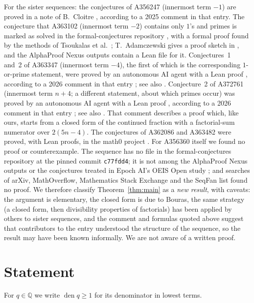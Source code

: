 \documentclass[11pt]{amsart}
\theoremstyle{plain}
\theoremstyle{definition}
\newcommand{\Q}{\mathbb{Q}}
\DeclareMathOperator{\den}{den}
\begin{document}
For the sister sequences: the conjectures of A356247 (innermost term $-1$) are proved in a note of B.~Cloitre \cite{Cloitre}, according to a 2025 comment in that entry. The conjecture that A363102 (innermost term $-2$) contains only $1$'s and primes is marked as solved in the formal-conjectures repository \cite{FC}, with a formal proof found by the methods of Tsoukalas et al.\ \cite{Tsoukalas}; T.~Adamczewski gives a proof sketch in \cite[Appendix~A]{Ad}, and the AlphaProof Nexus outputs \cite{APN} contain a Lean file for it. Conjectures~1 and~2 of A363347 (innermost term $-4$), the first of which is the corresponding $1$-or-prime statement, were proved by an autonomous AI agent with a Lean proof \cite{APN}, according to a 2026 comment in that entry \cite{A363347}; see also \cite[Appendix~A]{Ad}. Conjecture~2 of A372761 (innermost term $n+4$; a different statement, about which primes occur) was proved by an autonomous AI agent with a Lean proof \cite{APN}, according to a 2026 comment in that entry \cite{A372761}; see also \cite[Appendix~A]{Ad}. That comment describes a proof which, like ours, starts from a closed form of the continued fraction with a factorial-sum numerator over $2(5n-4)$. The conjectures of A362086 and A363482 were proved, with Lean proofs, in the math0 project \cite{M0A362086,M0A363482}.
For A356360 itself we found no proof or counterexample. The sequence has no file in the formal-conjectures repository \cite{FC} at the pinned commit \texttt{c77fdd4}; it is not among the AlphaProof Nexus outputs \cite{APN,Tsoukalas} or the conjectures treated in Epoch AI's OEIS Open study \cite{Ad}; and searches of arXiv, MathOverflow, Mathematics Stack Exchange and the SeqFan list found no proof. We therefore classify Theorem~\ref{thm:main} as a \emph{new result}, with caveats: the argument is elementary, the closed form is due to Bouras, the same strategy (a closed form, then divisibility properties of factorials) has been applied by others to sister sequences, and the comment and formulas quoted above suggest that contributors to the entry understood the structure of the sequence, so the result may have been known informally. We are not aware of a written proof.

\section{Statement}\label{sec:statement}

For $q\in\Q$ we write $\den q\ge1$ for its denominator in lowest terms.
\end{document}
